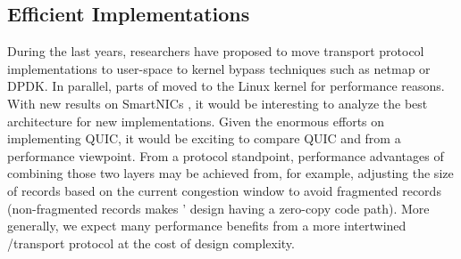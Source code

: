 \subsection{Efficient \tcpls Implementations}

During the last years, researchers have proposed
to move transport protocol implementations to user-space
\cite{jeong2014mtcp,marinos2014network} to
kernel bypass techniques such as netmap \cite{rizzo2012revisiting} or
DPDK. In parallel, parts of \tls moved to the Linux kernel
\cite{borkmanncombining} for performance reasons.
With new results on SmartNICs \cite{firestone2018azure}, it would be
interesting to analyze the best architecture for new \tcpls implementations.
Given the enormous efforts on implementing QUIC\cite{quicimplem},
it would be exciting
to compare QUIC and \tcpls from a performance viewpoint. From a protocol
standpoint, performance advantages of combining those two layers may be
achieved from, for example, adjusting the size of \tls records based on the
current \tcp congestion
window to avoid fragmented records (non-fragmented records makes \tcpls'
design having a zero-copy code path). More generally, we expect many performance
benefits from a more intertwined \tls/\tcp transport protocol at the
cost of design complexity.








